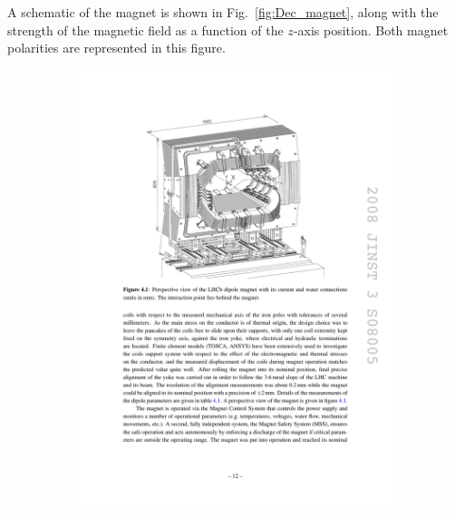 A schematic of the magnet is shown in Fig.~\ref{fig:Dec_magnet}, along with the strength of the magnetic field as a function of the $z$-axis position. Both magnet polarities are represented in this figure. 


\begin{figure}[!h]
    \centering
    \begin{subfigure}[t]{0.4\textwidth}
        \centering
        \includegraphics[width=1.0\textwidth]{figs/Detector/magnet_schematic.pdf}
    \end{subfigure}
    \begin{subfigure}[t]{0.4\textwidth}
        \centering

\end{subfigure}
\end{figure}
